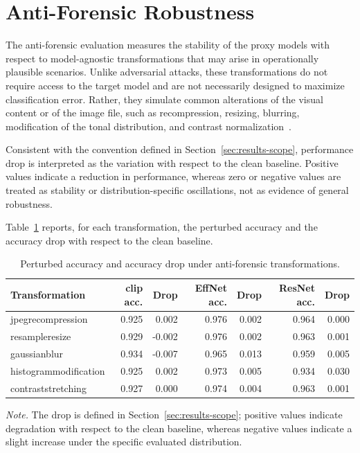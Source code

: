 \section{Anti-Forensic Robustness}
\label{sec:results-antiforensic}

The anti-forensic evaluation measures the stability of the proxy models with
respect to model-agnostic transformations that may arise in operationally
plausible scenarios. Unlike adversarial attacks, these transformations do not
require access to the target model and are not necessarily designed to maximize
classification error. Rather, they simulate common alterations of the visual
content or of the image file, such as recompression, resizing, blurring,
modification of the tonal distribution, and contrast
normalization~\cite{stamm2010anti,yaacoub2021digital,hendrycks2019benchmarking}.

Consistent with the convention defined in Section~\ref{sec:results-scope},
performance drop is interpreted as the variation with respect to the clean
baseline. Positive values indicate a reduction in performance, whereas zero or
negative values are treated as stability or distribution-specific oscillations,
not as evidence of general robustness.

Table~\ref{tab:results-antiforensic-robustness} reports, for each
transformation, the perturbed accuracy and the accuracy drop with respect to the
clean baseline.

\begin{table}[H]
\centering
\scriptsize
\setlength{\tabcolsep}{3.3pt}
\renewcommand{\arraystretch}{1.15}
\caption{Perturbed accuracy and accuracy drop under anti-forensic transformations.}
\label{tab:results-antiforensic-robustness}
\begin{tabular}{@{}l r r r r r r@{}}
\toprule
\textbf{Transformation} &
\textbf{\gls{clip} acc.} & \textbf{Drop} &
\textbf{EffNet acc.} & \textbf{Drop} &
\textbf{ResNet acc.} & \textbf{Drop} \\
\midrule
\gls{jpegrecompression} & 0.925 & 0.002 & 0.976 & 0.002 & 0.964 & 0.000 \\
\gls{resampleresize} & 0.929 & -0.002 & 0.976 & 0.002 & 0.963 & 0.001 \\
\gls{gaussianblur} & 0.934 & -0.007 & 0.965 & 0.013 & 0.959 & 0.005 \\
\gls{histogrammodification} & 0.925 & 0.002 & 0.973 & 0.005 & 0.934 & 0.030 \\
\gls{contraststretching} & 0.927 & 0.000 & 0.974 & 0.004 & 0.963 & 0.001 \\
\bottomrule
\end{tabular}

\vspace{0.4em}
\footnotesize
\textit{Note.} The drop is defined in Section~\ref{sec:results-scope};
positive values indicate degradation with respect to the clean baseline,
whereas negative values indicate a slight increase under the specific evaluated
distribution.
\end{table}

